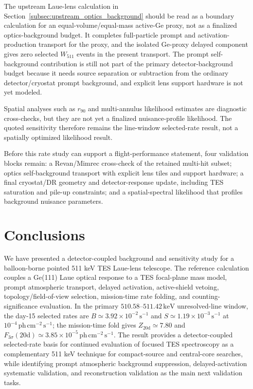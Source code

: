 \documentclass[preprint,12pt]{elsarticle}
\newcommand{\keV}{\,\mathrm{keV}}
\newcommand{\phcms}{\,\mathrm{ph\,cm^{-2}\,s^{-1}}}
\newcommand{\cps}{\,\mathrm{s^{-1}}}
\newcommand{\wii}{W_{511}}
\newcommand{\fthree}{F_{3\sigma}}
\begin{document}
The upstream Laue-lens calculation in Section~\ref{subsec:upstream_optics_background} should be read as a boundary calculation for an equal-volume/equal-mass active-Ge proxy, not as a finalized optics-background budget. It completes full-particle prompt and activation-production transport for the proxy, and the isolated Ge-proxy delayed component gives zero selected $\wii$ events in the present transport. The prompt self-background contribution is still not part of the primary detector-background budget because it needs source separation or subtraction from the ordinary detector/cryostat prompt background, and explicit lens support hardware is not yet modeled.

Spatial analyses such as $r_{90}$ and multi-annulus likelihood estimates are diagnostic cross-checks, but they are not yet a finalized nuisance-profile likelihood. The quoted sensitivity therefore remains the line-window selected-rate result, not a spatially optimized likelihood result.

Before this rate study can support a flight-performance statement, four validation blocks remain: a Revan/Mimrec cross-check of the retained multi-hit subset; optics self-background transport with explicit lens tiles and support hardware; a final cryostat/DR geometry and detector-response update, including TES saturation and pile-up constraints; and a spatial-spectral likelihood that profiles background nuisance parameters.

\section{Conclusions}
\label{sec:conclusions}

We have presented a detector-coupled background and sensitivity study for a balloon-borne pointed 511 keV TES Laue-lens telescope. The reference calculation couples a Ge(111) Laue optical response to a TES focal-plane mass model, prompt atmospheric transport, delayed activation, active-shield vetoing, topology/field-of-view selection, mission-time rate folding, and counting-significance evaluation. In the primary $510.58$--$511.42\keV$ unresolved-line window, the day-15 selected rates are $B\simeq3.92\times10^{-2}\cps$ and $S\simeq1.19\times10^{-3}\cps$ at $10^{-4}\phcms$; the mission-time fold gives $Z_{20\mathrm{d}}\simeq7.80$ and $\fthree(20\mathrm{d})\simeq3.85\times10^{-5}\phcms$. The result provides a detector-coupled selected-rate basis for continued evaluation of focused TES spectroscopy as a complementary 511 keV technique for compact-source and central-core searches, while identifying prompt atmospheric background suppression, delayed-activation systematic validation, and reconstruction validation as the main next validation tasks.
\end{document}
